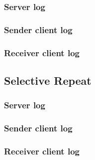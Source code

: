 \documentclass[14pt,titlepage, a4paper]{extarticle}
\begin{document}
\subsubsection{Server log}
\begin{multicols}{2}
\tiny{\obeylines{}}
\end{multicols}
\subsubsection{Sender client log}
\begin{multicols}{2}
\tiny{\obeylines{}}
\end{multicols}
\subsubsection{Receiver client log}
\begin{multicols}{1}
\tiny{\obeylines{}}
\end{multicols}

\subsection{Selective Repeat}
\subsubsection{Server log}
\begin{multicols}{2}
\tiny{\obeylines{}}
\end{multicols}
\subsubsection{Sender client log}
\begin{multicols}{2}
\tiny{\obeylines{}}
\end{multicols}
\subsubsection{Receiver client log}
\begin{multicols}{1}
\tiny{\obeylines{}}
\end{multicols}

\pagebreak
\end{document}
